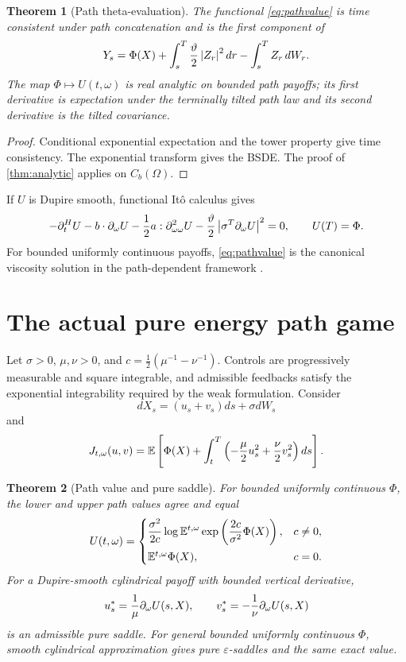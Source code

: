 \documentclass[11pt,reqno]{amsart}
\newtheorem{theorem}{Theorem}[section]
\theoremstyle{definition}
\theoremstyle{remark}
\newcommand{\E}{\mathbb E}
\newcommand{\abs}[1]{\left\lvert #1\right\rvert}
\begin{document}
\begin{theorem}[Path theta-evaluation]\label{thm:path}
The functional \eqref{eq:pathvalue} is time consistent under path
concatenation and is the first component of
\[
 Y_s=\Phi(X)+\int_s^T{\vartheta\over2}\abs{Z_r}^2dr
 -\int_s^TZ_r\,dW_r.
\]
The map $\Phi\mapsto U(t,\omega)$ is real analytic on bounded path payoffs; its
first derivative is expectation under the terminally tilted path law and its
second derivative is the tilted covariance.
\end{theorem}

\begin{proof}
Conditional exponential expectation and the tower property give time
consistency.  The exponential transform gives the BSDE.  The proof of
\cref{thm:analytic} applies on $C_b(\Omega)$.
\end{proof}

If $U$ is Dupire smooth, functional It\^o calculus
\cite{Dupire2009,ContFournie2013} gives
\[
 -\partial_t^HU-b\cdot\partial_\omega U
 -{1\over2}a:\partial_{\omega\omega}^2U
 -{\vartheta\over2}
 \abs{\sigma^T\partial_\omega U}^2=0,
 \qquad U(T)=\Phi.
\]
For bounded uniformly continuous payoffs, \eqref{eq:pathvalue} is the canonical
viscosity solution in the path-dependent framework
\cite{EkrenTouziZhang2014I,EkrenTouziZhang2014II}.

\section{The actual pure energy path game}\label{sec:pathgame}
Let $\sigma>0$, $\mu,\nu>0$, and
$c=\frac12(\mu^{-1}-\nu^{-1})$.  Controls are progressively measurable and
square integrable, and admissible feedbacks satisfy the exponential
integrability required by the weak formulation.  Consider
\[
 dX_s=(u_s+v_s)ds+\sigma dW_s
\]
and
\[
 J_{t,\omega}(u,v)=\E\left[
 \Phi(X)+\int_t^T
 \left(-{\mu\over2}u_s^2+{\nu\over2}v_s^2\right)ds\right].
\]

\begin{theorem}[Path value and pure saddle]\label{thm:pathgame}
For bounded uniformly continuous $\Phi$, the lower and upper path values agree
and equal
\[
 U(t,\omega)=
 \begin{cases}
 \displaystyle {\sigma^2\over2c}
 \log\E^{t,\omega}
 \exp\left({2c\over\sigma^2}\Phi(X)\right),&c\ne0,\\[2ex]
 \E^{t,\omega}\Phi(X),&c=0.
 \end{cases}
\]
For a Dupire-smooth cylindrical payoff with bounded vertical derivative,
\[
 u_s^*={1\over\mu}\partial_\omega U(s,X),
 \qquad
 v_s^*=-{1\over\nu}\partial_\omega U(s,X)
\]
is an admissible pure saddle.  For general bounded uniformly continuous
$\Phi$, smooth cylindrical approximation gives pure
$\varepsilon$-saddles and the same exact value.
\end{theorem}
\end{document}
